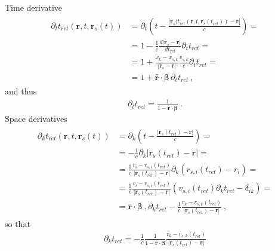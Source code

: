 \documentclass[letterpaper,10pt,english]{jupyterBook}
\begin{document}
\sphinxAtStartPar
Time derivative
\begin{equation*}
\begin{split}\begin{aligned}
  \partial_t t_{ret}(\mathbf{r}, t, \mathbf{r}_s(t)) 
  & = \partial_t \left( t - \frac{|\mathbf{r}_s(t_{ret}(\mathbf{r},t, \mathbf{r}_s(t_{ret})) - \mathbf{r}|}{c} \right) = \\
  & = 1 - \frac{1}{c} \frac{d |\mathbf{r}_s - \mathbf{r}|}{d t_{ret}} \partial_t t_{ret} = \\
  & = 1 + \frac{x_{k} - x_{s,k}}{|\mathbf{r}_s - \mathbf{r}|} \frac{v_{s,k}}{c} \partial_t t_{ret} = \\
  & = 1 + \hat{\mathbf{r}} \cdot \boldsymbol\beta \, \partial_t t_{ret} \ ,
\end{aligned}\end{split}
\end{equation*}
\sphinxAtStartPar
and thus
\begin{equation*}
\begin{split}\partial_t t_{ret} = \frac{1}{1 - \hat{\mathbf{r}} \cdot \boldsymbol\beta} \ .\end{split}
\end{equation*}
\sphinxAtStartPar
Space derivatives
\begin{equation*}
\begin{split}\begin{aligned}
  \partial_k t_{ret}(\mathbf{r}, t, \mathbf{r}_s(t)) 
  & = \partial_k \left( t - \frac{|\mathbf{r}_s(t_{ret}) - \mathbf{r}|}{c} \right) = \\
  & = - \frac{1}{c} \partial_k |\mathbf{r}_s(t_{ret}) - \mathbf{r}| = \\
  & = \frac{1}{c} \frac{r_i - r_{s,i}(t_{ret})}{|\mathbf{r}_s(t_{ret}) - \mathbf{r}|} \partial_k ( r_{s,i}(t_{ret}) - r_i )= \\
  & = \frac{1}{c} \frac{r_i - r_{s,i}(t_{ret})}{|\mathbf{r}_s(t_{ret}) - \mathbf{r}|} \left( v_{s,i}(t_{ret}) \partial_k t_{ret} - \delta_{ik} \right) = \\
  & = \hat{\mathbf{r}} \cdot \boldsymbol\beta \ , \partial_k t_{ret} - \frac{1}{c}\frac{r_k - r_{s,k}(t_{ret})}{|\mathbf{r}_s(t_{ret}) - \mathbf{r}|} \ ,
\end{aligned}\end{split}
\end{equation*}
\sphinxAtStartPar
so that
\begin{equation*}
\begin{split}\partial_k t_{ret} = - \frac{1}{c} \frac{1}{1 - \hat{\mathbf{r}} \cdot \boldsymbol\beta} \frac{r_k - r_{s,k}(t_{ret})}{|\mathbf{r}_s(t_{ret}) - \mathbf{r}|} \end{split}
\end{equation*}
\end{document}

